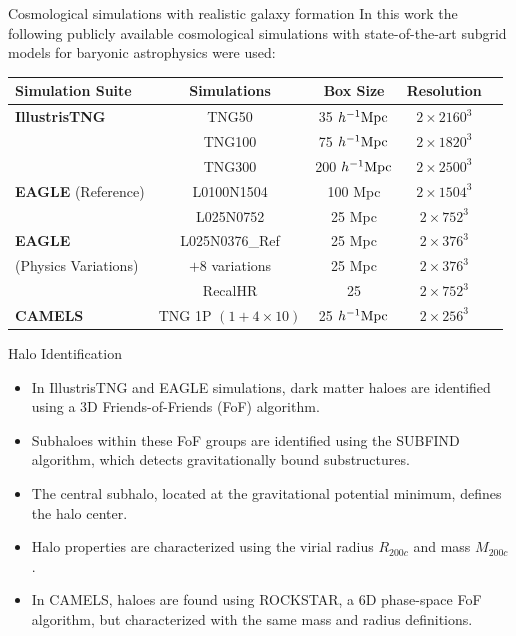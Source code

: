 \documentclass[11pt]{beamer}
\newcommand{\Mpch}{\ensuremath{h^{-1}{\rm Mpc}}}
\begin{document}
\begin{frame}{Cosmological simulations with realistic galaxy formation}
    \centering
    In this work the following publicly available cosmological simulations with state-of-the-art subgrid models for baryonic astrophysics were used:\\
    \vspace{0.5cm}
    \small
    \begin{tabular}{l c c c c}
    \toprule
    Simulation Suite & Simulations & Box Size & Resolution \\
    \midrule
    \textbf{IllustrisTNG} & TNG50 & 35 \Mpch & $2\times 2160^3$ \\
                          & TNG100 & 75 \Mpch & $2\times 1820^3$ \\
                          & TNG300 & 200 \Mpch & $2\times 2500^3$ \\
    \midrule
    \textbf{EAGLE} (Reference) & L0100N1504 & 100 Mpc & $2\times 1504^3$ \\
                               & L025N0752 & 25 Mpc & $2\times 752^3$ \\
    \midrule
    \textbf{EAGLE}  & L025N0376\_Ref & 25 Mpc & $2\times 376^3$ \\
    (Physics Variations) & $+8$ variations & 25 Mpc & $2\times 376^3$ \\
     & RecalHR & 25 & $2\times 752^3$ \\
    \midrule
    \textbf{CAMELS} & TNG 1P $(1+4\times 10)$ & 25 \Mpch & $2\times 256^3$ \\
    \bottomrule
    \end{tabular}
\end{frame}

\begin{frame}{Halo Identification}
    \begin{itemize}
        \item In IllustrisTNG and EAGLE simulations, dark matter haloes are identified using a 3D Friends-of-Friends (FoF) algorithm.
        \item Subhaloes within these FoF groups are identified using the SUBFIND algorithm, which detects gravitationally bound substructures.
        \item The central subhalo, located at the gravitational potential minimum, defines the halo center.
        \item Halo properties are characterized using the virial radius $R_{200c}$ and mass $M_{200c}$.
        \item In CAMELS, haloes are found using ROCKSTAR, a 6D phase-space FoF algorithm, but characterized with the same mass and radius definitions.
    \end{itemize}
\end{frame}
\end{document}

